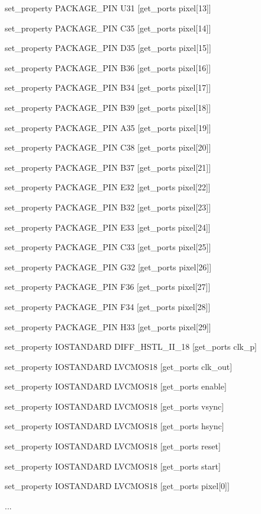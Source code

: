 {set\_property PACKAGE\_PIN U31 [get\_ports {pixel[13]}]

set\_property PACKAGE\_PIN C35 [get\_ports {pixel[14]}]

set\_property PACKAGE\_PIN D35 [get\_ports {pixel[15]}]

set\_property PACKAGE\_PIN B36 [get\_ports {pixel[16]}]

set\_property PACKAGE\_PIN B34 [get\_ports {pixel[17]}]

set\_property PACKAGE\_PIN B39 [get\_ports {pixel[18]}]

set\_property PACKAGE\_PIN A35 [get\_ports {pixel[19]}]

set\_property PACKAGE\_PIN C38 [get\_ports {pixel[20]}]

set\_property PACKAGE\_PIN B37 [get\_ports {pixel[21]}]

set\_property PACKAGE\_PIN E32 [get\_ports {pixel[22]}]

set\_property PACKAGE\_PIN B32 [get\_ports {pixel[23]}]

set\_property PACKAGE\_PIN E33 [get\_ports {pixel[24]}]

set\_property PACKAGE\_PIN C33 [get\_ports {pixel[25]}]

set\_property PACKAGE\_PIN G32 [get\_ports {pixel[26]}]

set\_property PACKAGE\_PIN F36 [get\_ports {pixel[27]}]

set\_property PACKAGE\_PIN F34 [get\_ports {pixel[28]}]

set\_property PACKAGE\_PIN H33 [get\_ports {pixel[29]}]

set\_property IOSTANDARD DIFF\_HSTL\_II\_18 [get\_ports clk\_p]

set\_property IOSTANDARD LVCMOS18 [get\_ports clk\_out]

set\_property IOSTANDARD LVCMOS18 [get\_ports enable]

set\_property IOSTANDARD LVCMOS18 [get\_ports vsync]

set\_property IOSTANDARD LVCMOS18 [get\_ports hsync]

set\_property IOSTANDARD LVCMOS18 [get\_ports reset]

set\_property IOSTANDARD LVCMOS18 [get\_ports start]

set\_property IOSTANDARD LVCMOS18 [get\_ports {pixel[0]}]

...

}
